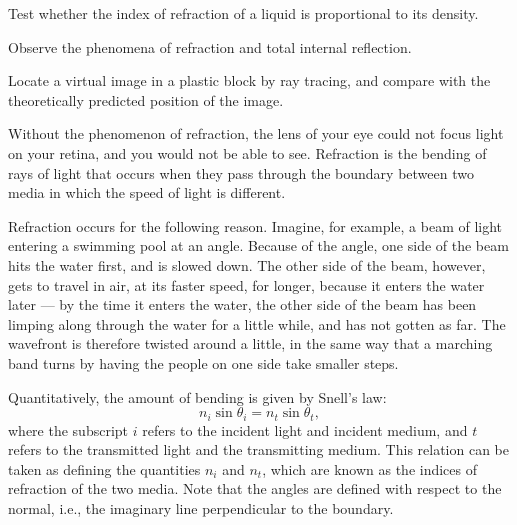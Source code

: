 \label{lab:refraction}

\apparatus
{}

\begin{goals}

\item[] Test whether the index of refraction of a liquid is proportional to its density.

\item[] Observe the phenomena of refraction and total internal reflection.

\item[] Locate a virtual image in a plastic block by ray tracing,
and compare with the theoretically predicted position of the image.
\end{goals}

\introduction

Without the phenomenon of refraction, the lens of your eye
could not focus light on your retina, and you would not be
able to see. Refraction is the bending of rays of light that
occurs when they pass through the boundary between two media
in which the speed of light is different. 

Refraction occurs for the following
reason. Imagine, for example, a beam of light entering a
swimming pool at an angle. Because of the angle, one side of
the beam hits the water first, and is slowed down. The other
side of the beam, however, gets to travel in air, at its
faster speed, for longer, because it enters the water later
--- by the time it enters the water, the other side of the
beam has been limping along through the water for a little
while, and has not gotten as far. The wavefront is therefore
twisted around a little, in the same way that a marching band
turns by having the people on one side take smaller steps.


Quantitatively, the amount of bending is given by Snell's law:
\begin{equation*}
    n_i\sin \theta_i = n_t \sin \theta_t    ,
\end{equation*}
where the subscript $i$ refers to the incident light and
incident medium, and $t$ refers to the transmitted light and
the transmitting medium. This relation can be taken as defining
the quantities $n_i$ and $n_t$, which are known as the indices of
refraction of the two media. Note that the angles are defined
with respect to the normal, i.e., the imaginary line
perpendicular to the boundary. 

